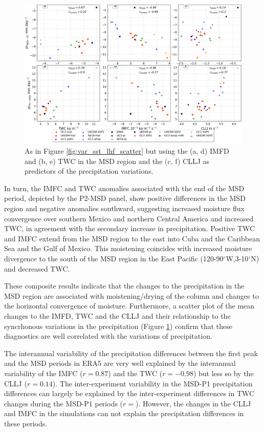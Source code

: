  \begin{figure}[t!]
\includegraphics[width=\linewidth]{figures/imfd_scatter}
\caption[Scatterplot of TWC, IMFD and CLLJ]{As in Figure \ref{fig:var_sst_lhf_scatter} but using the (a, d) IMFD and (b, e) TWC in the MSD region and the (c, f) CLLJ as predictors of the precipitation variations.  }
\label{fig:imfd_scatter}
\end{figure}


In turn, the IMFC and TWC anomalies associated with the end of the MSD period, depicted by the P2-MSD panel,  show positive differences in the MSD region and negative anomalies southward, suggesting increased moisture flux convergence over southern Mexico and northern Central America and increased TWC, in agreement with the secondary increase in precipitation. Positive TWC and IMFC extend from the MSD region to the east into Cuba and the Caribbean Sea and the Gulf of Mexico. This moistening coincides with increased moisture divergence to the south of the MSD region in the East Pacific (120-90$^\circ$W,3-10$^\circ$N) and decreased TWC. 

These composite results indicate that the changes to the precipitation in the MSD region are associated with moistening/drying of the column and changes to the horizontal convergence of moisture. Furthermore, a scatter plot of the mean changes to the IMFD, TWC and the CLLJ and their relationship to the syncrhonous variations in the precipitation (Figure \ref{fig:imfd_scatter}) confirm that these diagnostics are well correlated with the variations of precipitation. 

The interannual variability of the precipitation differences between the first peak and the MSD periods in ERA5  are very well explained by the interannual variability of the IMFC ($r=0.87$) and the TWC ($r=-0.98$) but less so by the CLLJ ($r=0.14$). The inter-experiment variability in the MSD-P1 precipitation differences can largely be explained by the inter-experiment differences in TWC changes during the MSD-P1 periods ($r=$). However, the changes in the CLLJ and IMFC in the simulations can not explain the precipitation differences in these periods. 

